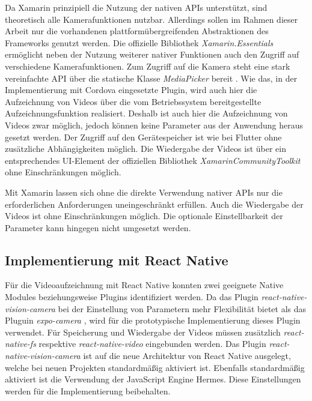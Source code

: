 Da Xamarin prinzipiell die Nutzung der nativen \acp{API} unterstützt, sind theoretisch alle Kamerafunktionen nutzbar.
Allerdings sollen im Rahmen dieser Arbeit nur die vorhandenen plattformübergreifenden Abstraktionen des Frameworks genutzt werden.
Die offizielle Bibliothek \textit{Xamarin.Essentials} ermöglicht neben der Nutzung weiterer nativer Funktionen auch den Zugriff auf verschiedene Kamerafunktionen.
Zum Zugriff auf die Kamera steht eine stark vereinfachte \ac{API} über die statische Klasse \textit{MediaPicker} bereit \cite{Xamarin_MediaPicker}.
Wie das, in der Implementierung mit Cordova eingesetzte Plugin, wird auch hier die Aufzeichnung von Videos über die vom Betriebssystem bereitgestellte Aufzeichnungsfunktion realisiert.
Deshalb ist auch hier die Aufzeichnung von Videos zwar möglich, jedoch können keine Parameter aus der Anwendung heraus gesetzt werden.
Der Zugriff auf den Gerätespeicher ist wie bei Flutter ohne zusätzliche Abhängigkeiten möglich.
Die Wiedergabe der Videos ist über ein entsprechendes \ac{UI}-Element der offiziellen Bibliothek \textit{XamarinCommunityToolkit} \cite{Xamarin_CommunityToolkit} ohne Einschränkungen möglich.

Mit Xamarin lassen sich ohne die direkte Verwendung nativer \acp{API} nur die erforderlichen Anforderungen uneingeschränkt erfüllen.
Auch die Wiedergabe der Videos ist ohne Einschränkungen möglich.
Die optionale Einstellbarkeit der Parameter kann hingegen nicht umgesetzt werden.


\subsection{Implementierung mit React Native}
\label{sec:evaluation_reactnative}

Für die Videoaufzeichnung mit React Native konnten zwei geeignete Native Modules beziehungsweise Plugins identifiziert werden.
Da das Plugin \textit{react-native-vision-camera} \cite{Vision_Camera} bei der Einstellung von Parametern mehr Flexibilität bietet als das Pluguin \textit{expo-camera} \cite{Expo_Camera}, wird für die prototypische Implementierung dieses Plugin verwendet.
Für Speicherung und Wiedergabe der Videos müssen zusätzlich \textit{react-native-fs} \cite{ReactNative_FileSystem} respektive \textit{react-native-video} \cite{ReactNative_Video} eingebunden werden.
Das Plugin \textit{react-native-vision-camera} ist auf die neue Architektur von React Native ausgelegt, welche bei neuen Projekten standardmäßig aktiviert ist.
Ebenfalls standardmäßig aktiviert ist die Verwendung der JavaScript Engine Hermes.
Diese Einstellungen werden für die Implementierung beibehalten.

